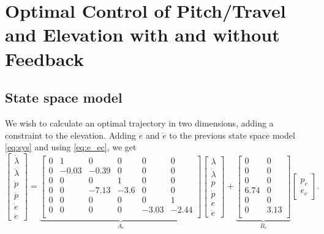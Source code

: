 \section{Optimal Control of Pitch/Travel and Elevation with and without Feedback}\label{sec:prob4}
\label{text:problem4}

\subsection{State space model}
We wish to calculate an optimal trajectory in two dimensions, adding a constraint to the elevation. Adding $e$ and $\dot{e}$ to the previous state space model \eqref{eq:sys} and using \eqref{eq:e_ec}, we get
\begin{equation}
	\begin{bmatrix}
		\dot{\lambda}\\
		\ddot{\lambda}	\\
		\dot{p}	\\
		\ddot{p}\\
		\dot{e}	\\
		\ddot{e}
	\end{bmatrix} = 
	\underbrace{
	\begin{bmatrix}
		0 & 1 & 0 & 0 & 0  & 0 \\
		0 & -0.03 & -0.39 & 0 & 0 & 0 \\
		0 & 0 & 0 & 1 & 0 & 0 \\
		0 & 0 & -7.13 & -3.6 & 0 & 0 \\
		0 & 0 & 0 & 0 & 0 & 1 \\
		0 & 0 & 0 & 0 & -3.03 & -2.44 \\
	\end{bmatrix}}_{A_c}
	\begin{bmatrix}
		\lambda	\\
		\dot{\lambda}\\
		p		\\
		\dot{p} \\
		e		\\
		\dot{e}
	\end{bmatrix} +
	\underbrace{
	\begin{bmatrix}
		0 & 0\\
		0 & 0\\
		0 & 0\\
		6.74 & 0\\
		0 & 0 \\
		0 & 3.13 \\
	\end{bmatrix}}_{B_c}
	\begin{bmatrix}
	p_c \\
	e_c
	\end{bmatrix}.
	\label{eq:ex_sys}
\end{equation}

